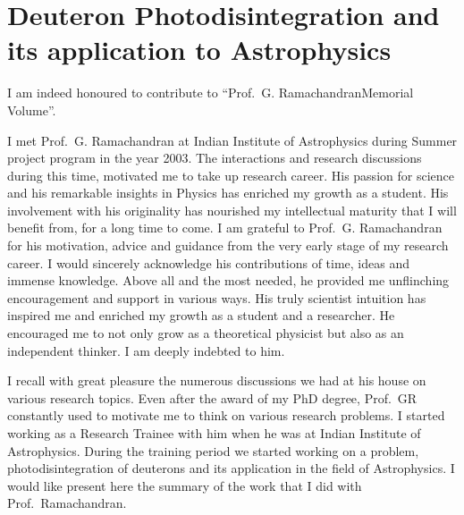 \chapter[Deuteron Photodisintegration and its application to\hfil\break Astrophysics]{Deuteron Photodisintegration and its application to Astrophysics}\label{chap34}


I am indeed honoured to contribute to ``Prof.\ G. Ramachandran\break Memorial Volume''. 

I met Prof.\ G. Ramachandran at Indian Institute of Astrophysics during Summer project program in the year 2003. The interactions and research discussions during this time, motivated me to take up research career. His passion for science and his remarkable insights in Physics has enriched my growth as a student. His involvement with his originality has nourished my intellectual maturity that I will benefit from, for a long time to come. I am grateful to  Prof.\ G. Ramachandran for his motivation, advice and guidance from the very early stage of my research career. I would sincerely acknowledge his contributions of time, ideas and immense knowledge. Above all and the most needed, he provided me unflinching encouragement and support in various ways. His truly scientist intuition has inspired me and enriched my growth as a student and a researcher. He encouraged me to not only grow as a theoretical physicist but also as an independent thinker. I am deeply indebted to him.

I  recall with great pleasure the numerous discussions we had at his house on various research topics. Even after the award of my PhD degree, Prof.\ GR constantly used to motivate me to think on various research problems. I started working as a Research Trainee with him when he was at Indian Institute of Astrophysics. During the training period we started working on a problem, photodisintegration of deuterons and its application in the field of Astrophysics. I would like present here the summary of the work that I did with Prof.\ Ramachandran.

